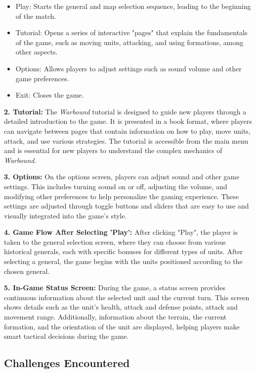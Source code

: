 \begin{itemize}
    \begin{itemize}
        \item Play: Starts the general and map selection sequence, leading to the beginning of the match.
        \item Tutorial: Opens a series of interactive "pages" that explain the fundamentals of the game, such as moving units, attacking, and using formations, among other aspects.
        \item Options: Allows players to adjust settings such as sound volume and other game preferences.
        \item Exit: Closes the game.
    \end{itemize}

    \textbf{2. Tutorial:} The \textit{Warbound} tutorial is designed to guide new players through a detailed introduction to the game. It is presented in a book format, where players can navigate between pages that contain information on how to play, move units, attack, and use various strategies. The tutorial is accessible from the main menu and is essential for new players to understand the complex mechanics of \textit{Warbound}.

    \textbf{3. Options:} On the options screen, players can adjust sound and other game settings. This includes turning sound on or off, adjusting the volume, and modifying other preferences to help personalize the gaming experience. These settings are adjusted through toggle buttons and sliders that are easy to use and visually integrated into the game's style.

    \textbf{4. Game Flow After Selecting 'Play':} After clicking "Play", the player is taken to the general selection screen, where they can choose from various historical generals, each with specific bonuses for different types of units. After selecting a general, the game begins with the units positioned according to the chosen general.

    \textbf{5. In-Game Status Screen:} During the game, a status screen provides continuous information about the selected unit and the current turn. This screen shows details such as the unit's health, attack and defense points, attack and movement range. Additionally, information about the terrain, the current formation, and the orientation of the unit are displayed, helping players make smart tactical decisions during the game.

\end{itemize}

\subsection{Challenges Encountered}

